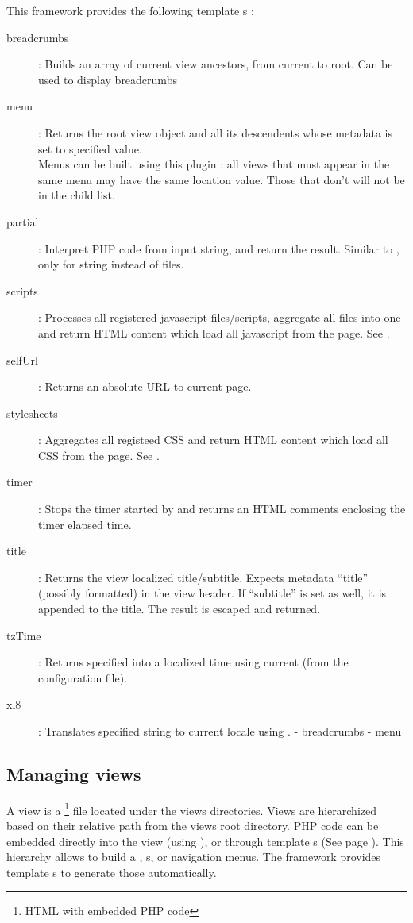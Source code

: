 \documentclass[pdftex,12pt,a4paper]{article}
\begin{document}
This framework provides the following template s :
\begin{description}
	\item[breadcrumbs] : Builds an array of current view ancestors, from current to root. Can be used to display breadcrumbs
	\item[menu] : Returns the root view object and all its descendents whose  metadata is set to specified value. \\
	Menus can be built using this plugin : \ie all views that must appear in the same menu may have the same location value. Those that don't will not be in the child list.
	\item[partial] : Interpret PHP code from input string, and return the result. Similar to , only for string instead of files.
	\item[scripts] : Processes all registered javascript files/scripts, aggregate all files into one and return HTML content which load all javascript from the page. See .
	\item[selfUrl] : Returns an absolute URL to current page.
	\item[stylesheets] : Aggregates all registeed CSS and return HTML content which load all CSS from the page. See .
	\item[timer] : Stops the timer started by  and returns an HTML comments enclosing the timer elapsed time.
	\item[title] : Returns the view localized title/subtitle. Expects metadata ``title'' (possibly  formatted) in the view header. If ``subtitle'' is set as well, it is appended to the title. The result is escaped and returned.
	\item[tzTime] : Returns specified  into a localized time using current  (from the configuration file).
	\item[xl8] : Translates specified string to current locale using .
- breadcrumbs
- menu
\end{description}

\subsection{Managing views} \label{sec:managing-views}

A view is a \footnote{HTML with embedded PHP code} file located under the views directories. Views are hierarchized based on their relative path from the views root directory.
PHP code can be embedded directly into the view (using ), or through template s (See page \pageref{sec:template-filters-and-plugins}).
This hierarchy allows to build a , s, or navigation menus. The framework provides template s to generate those automatically.
\end{document}
